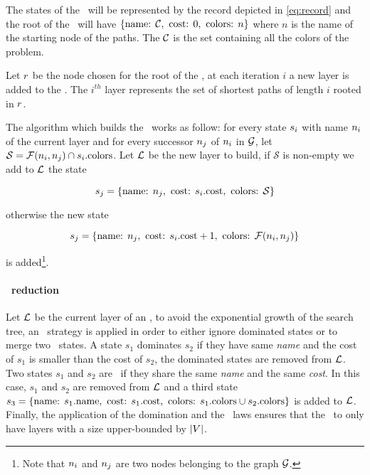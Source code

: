 The states of the \mdd\ will be represented by the record depicted in \cref{eq:record} and the root of the \mdd\ will have $\{\text{name: } \mathcal{C}, \text{ cost: } 0, \text{ colors: } n \}$ where $n$ is the name of the starting node of the paths. The $\mathcal{C}$ is the set containing all the colors of the problem.

Let $r$ be the node chosen for the root of the \mdd, at each iteration $i$ a new layer is added to the \mdd. The $i^{th}$ layer represents the set of shortest paths of length $i$ rooted in $r$.

The algorithm which builds the \mdd\ works as follow: for every state $s_i$ with name $n_i$ of the current layer and for every successor $n_j$ of $n_i$ in $\mathcal{G}$, let $\mathcal{S} = \mathcal{F}(n_i, n_j) \cap s_i\text{.colors}$. Let $\mathcal{L}$ be the new layer to build, if $\mathcal{S}$ is non-empty we add to $\mathcal{L}$ the state

$$s_j = \{\text{name: } n_j, \text{ cost: } s_i\text{.cost}, \text{ colors: } \mathcal{S} \}$$

otherwise the new state

$$s_j = \{\text{name: } n_j, \text{ cost: } s_i\text{.cost} + 1, \text{ colors: } \mathcal{F}(n_i, n_j) \}$$

is added\footnote{Note that $n_i$ and $n_j$ are two nodes belonging to the graph $\mathcal{G}$.}.

\paragraph{\mdd\ reduction} Let $\mathcal{L}$ be the current layer of an \mdd, to avoid the exponential growth of the search tree, an \adhoc\ strategy is applied in order to either ignore dominated states or to merge two \compatibleState\ states. A state $s_1$ dominates $s_2$ if they have same \textit{name} and the cost of $s_1$ is smaller than the cost of $s_2$, the dominated states are removed from $\mathcal{L}$. Two states $s_1$ and $s_2$ are \compatibleState\ if they share the same \textit{name} and the same \textit{cost}. In this case, $s_1$ and $s_2$ are removed from $\mathcal{L}$ and a third state $s_3 = \{\text{name: } s_1\text{.name}, \text{ cost: } s_1.\text{cost}, \text{ colors: } s_1\text{.colors} \cup s_2\text{.colors} \}$ is added to $\mathcal{L}$.\\
Finally, the application of the domination and the \compatibleState\ laws ensures that the \mdd\ to only have layers with a size upper-bounded by $|V|$.

